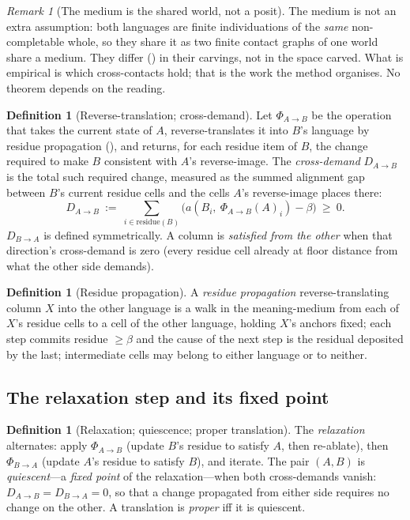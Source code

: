 \documentclass[11pt,a4paper]{article}
\theoremstyle{thmstyle}
\theoremstyle{definition}
\newtheorem{definition}[theorem]{Definition}
\theoremstyle{remark}
\newtheorem{remark}[theorem]{Remark}
\newcommand{\flo}{\beta}               %
\newcommand{\align}{a}                 %
\newcommand{\colA}{A}                  %
\newcommand{\colB}{B}                  %
\newcommand{\demand}{D}                %
\newcommand{\relax}{\Phi}              %
\begin{document}
\begin{remark}[The medium is the shared world, not a posit]
\label{rem:medium}
The medium is not an extra assumption: both languages are finite
individuations of the \emph{same} non-completable whole, so they share it as
two finite contact graphs of one world share a medium. They differ
() in their carvings, not in the space carved. What is
empirical is which cross-contacts hold; that is the work the method
organises. No theorem depends on the reading.
\end{remark}

\begin{definition}[Reverse-translation; cross-demand]
\label{def:demand}
Let $\relax_{\colA\to\colB}$ be the operation that takes the current state of
$\colA$, reverse-translates it into $\colB$'s language by residue propagation
(), and returns, for each residue item of $\colB$, the
change required to make $\colB$ consistent with $\colA$'s reverse-image. The
\emph{cross-demand} $\demand_{\colA\to\colB}$ is the total such required
change, measured as the summed alignment gap between $\colB$'s current
residue cells and the cells $\colA$'s reverse-image places there:
\[
\demand_{\colA\to\colB}\ :=\ \sum_{i\in\mathrm{residue}(\colB)}
\bigl(\align(\colB_i,\ \relax_{\colA\to\colB}(\colA)_i)-\flo\bigr)\ \ge\ 0.
\]
$\demand_{\colB\to\colA}$ is defined symmetrically. A column is
\emph{satisfied from the other} when that direction's cross-demand is zero
(every residue cell already at floor distance from what the other side
demands).
\end{definition}

\begin{definition}[Residue propagation]
\label{def:propagation}
A \emph{residue propagation} reverse-translating column $X$ into the other
language is a walk in the meaning-medium from each of $X$'s residue cells to
a cell of the other language, holding $X$'s anchors fixed; each step commits
residue $\ge\flo$ and the cause of the next step is the residual deposited by
the last; intermediate cells may belong to either language or to neither.
\end{definition}

\subsection{The relaxation step and its fixed point}

\begin{definition}[Relaxation; quiescence; proper translation]
\label{def:relaxation}
The \emph{relaxation} alternates: apply $\relax_{\colA\to\colB}$ (update
$\colB$'s residue to satisfy $\colA$, then re-ablate), then
$\relax_{\colB\to\colA}$ (update $\colA$'s residue to satisfy $\colB$), and
iterate. The pair $(\colA,\colB)$ is \emph{quiescent}---a \emph{fixed point}
of the relaxation---when both cross-demands vanish:
$\demand_{\colA\to\colB}=\demand_{\colB\to\colA}=0$, so that a change
propagated from either side requires no change on the other. A translation is
\emph{proper} iff it is quiescent.
\end{definition}
\end{document}
